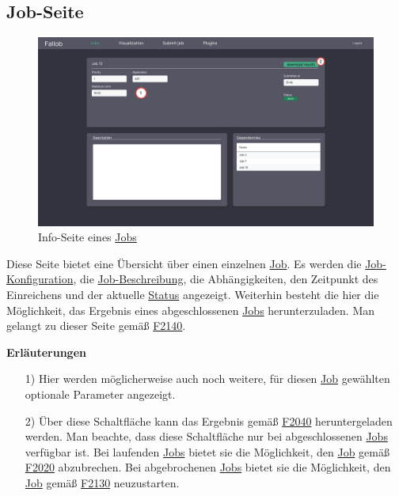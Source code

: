 \subsection{Job-Seite}
\label{pages:job-page}
\begin{figure}[H]
    \centering
    \includegraphics[width=\textwidth]{images-interface/v5_interface/job_info_page_5.pdf}
    \caption{Info-Seite eines \hyperref[B:Jobs]{Jobs}}
    \label{fig:job-page}
\end{figure}
Diese Seite bietet eine Übersicht über einen einzelnen \hyperref[B:Jobs]{Job}. Es werden die \hyperref[B:Job-Konfiguration]{Job-Konfiguration}, die \hyperref[B:Job-Beschreibung]{Job-Beschreibung}, die Abhängigkeiten, den Zeitpunkt des Einreichens und der aktuelle \hyperref[B:Job-Status]{Status} angezeigt. Weiterhin besteht die hier die Möglichkeit, das Ergebnis eines abgeschlossenen \hyperref[B:Jobs]{Jobs} herunterzuladen. Man gelangt zu dieser Seite gemäß \hyperref[FA:Web-Interface:Einsehen von Job-Informationen]{F2140}.

\textbf{Erläuterungen}
\begin{itemize}
    \item[1)] Hier werden möglicherweise auch noch weitere, für diesen \hyperref[B:Jobs]{Job} gewählten optionale Parameter angezeigt.
    \item[2)] Über diese Schaltfläche kann das Ergebnis gemäß \hyperref[FA:Web-Interface:Herunterladen eines einzelnen Ergebnisses]{F2040} heruntergeladen werden. Man beachte, dass diese Schaltfläche nur bei abgeschlossenen \hyperref[B:Jobs]{Jobs} verfügbar ist. Bei laufenden \hyperref[B:Jobs]{Jobs} bietet sie die Möglichkeit, den \hyperref[B:Jobs]{Job} gemäß \hyperref[FA:Web-Interface:Abbruch eines einzelnen Jobs]{F2020} abzubrechen. Bei abgebrochenen \hyperref[B:Jobs]{Jobs} bietet sie die Möglichkeit, den \hyperref[B:Jobs]{Job} gemäß \hyperref[Neustart eines abgebrochenen Jobs]{F2130} neuzustarten.
\end{itemize}

